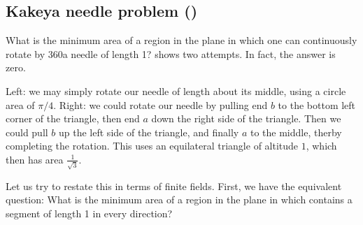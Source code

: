 \subsection{Kakeya needle problem (\cite{Kakeya})}
What is the minimum area of a region in the plane in which one can continuously rotate by 360\textdegree  a needle of length 1?  shows two attempts.
In fact, the answer is zero.
\begin{marginfigure}
\hfill
{}
\hfill
{}
\hfill
\caption{Left: we may simply rotate our needle of length about its middle, using a circle area of $\pi/4$. Right: we could rotate our needle by pulling end $b$ to the bottom left corner of the triangle, then end $a$ down the right side of the triangle. Then we could pull $b$ up the left side of the triangle, and finally $a$ to the middle, therby completing the rotation. This uses an equilateral triangle of altitude $1$, which then has area $\frac{1}{\sqrt{3}}$.} \label{fig:needle_circ_tri}
\end{marginfigure}

Let us try to restate this in terms of finite fields. First, we have the equivalent question: What is the minimum area of a region in the plane in which contains a segment of length 1 in every direction?

